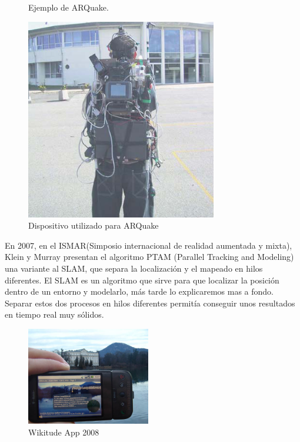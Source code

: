 \begin{figure}[ht]
\begin{minipage}{0.32\textwidth}
    \caption{Ejemplo de ARQuake.}
    \label{fig:Ex_ARQuake}
    \end{minipage}
        \begin{minipage}{0.32\textwidth}
        \centering
        \includegraphics[width=\linewidth]{Images/ARQuake_Dispositivo.png}
    \caption{Dispositivo utilizado para ARQuake}
    \label{fig:Dispositivo_ARQuake}
    \end{minipage}
\end{figure}


En 2007, en el ISMAR(Simposio internacional de realidad aumentada y mixta), Klein y Murray presentan el algoritmo PTAM (Parallel Tracking and Modeling) una variante al SLAM, que separa la localización y el mapeado en hilos diferentes. El SLAM es un algoritmo que sirve para que localizar la posición dentro de un entorno y modelarlo, más tarde lo explicaremos mas a fondo. Separar estos dos procesos en hilos diferentes permitía conseguir unos resultados en tiempo real muy sólidos.\\

\begin{figure}
    \centering
    \includegraphics[width=0.48\textwidth]{Images/Wikitude_Example.jpeg}
    \caption{Wikitude App 2008}
    \label{fig:wikitude2008}
\end{figure}

